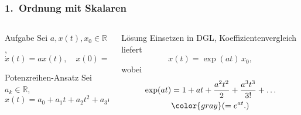 %
%
%
\bgroup

\begin{frame}[t]
  \setlength{\abovedisplayskip}{5pt}
  \setlength{\belowdisplayskip}{5pt}
  \frametitle{1.~Ordnung mit Skalaren}
  \vspace{-20pt}
  \begin{columns}[t,onlytextwidth]
  \begin{column}{0.48\textwidth}
    \begin{block}{Aufgabe}
      Sei $a, x(t), x_0 \in \mathbb R$,
      \[
      \dot x(t) = ax(t),
      \quad
      x(0) = x_0
      \]
    \end{block}
    \begin{block}{Potenzreihen-Ansatz}
      Sei $a_k \in \mathbb R$,
      \[
      x(t) = a_0 + a_1t + a_2t^2 + a_3t^3 \ldots
      \]
    \end{block}
  \end{column}
  \begin{column}{0.48\textwidth}
    \begin{block}{Lösung}
      Einsetzen in DGL, Koeffizientenvergleich liefert
      \[ x(t) = \exp(at) \, x_0, \]
      wobei
      \begin{align*}
      \exp(at)
      &= 1 + at + \frac{a^2t^2}{2} + \frac{a^3t^3}{3!} + \ldots \\
      &{\color{gray}(= e^{at}.)}
      \end{align*}
    \end{block}
  \end{column}
  \end{columns}
\end{frame}

